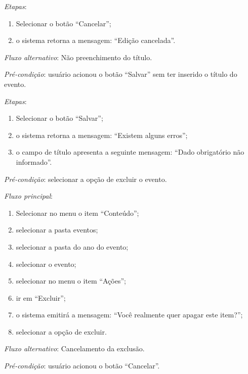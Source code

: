 \noindent \textit{Etapas}:

\begin{enumerate}
    \item Selecionar o botão ``Cancelar'';
    \item o sistema retorna a mensagem: ``Edição cancelada''.
\end{enumerate}

\noindent \textit{Fluxo alternativo}: Não preenchimento do título.

\noindent \textit{Pré-condição}: usuário acionou o botão ``Salvar'' sem ter inserido o título do evento.

\noindent \textit{Etapas}:

\begin{enumerate}
    \item Selecionar o botão ``Salvar'';
    \item o sistema retorna a mensagem: ``Existem alguns erros'';
    \item o campo de título apresenta a seguinte mensagem: ``Dado obrigatório não informado''.
\end{enumerate}



\vspace{0.7cm}

\noindent \textit{Pré-condição}: selecionar a opção de excluir o evento.

\noindent \textit{Fluxo principal}:

\begin{enumerate}
    \item Selecionar no menu o item ``Conteúdo'';
    \item selecionar a pasta eventos;
    \item selecionar a pasta do ano do evento;
    \item selecionar o evento;
    \item selecionar no menu o item ``Ações'';
    \item ir em ``Excluir'';
    \item o sistema emitirá a mensagem: ``Você realmente quer apagar este item?'';
    \item selecionar a opção de excluir.
\end{enumerate}

\noindent \textit{Fluxo alternativo}: Cancelamento da exclusão.

\noindent \textit{Pré-condição}: usuário acionou o botão ``Cancelar''.

